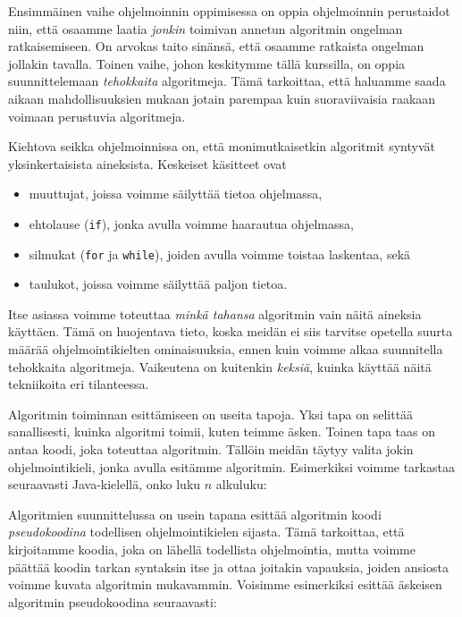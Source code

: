 Ensimmäinen vaihe ohjelmoinnin oppimisessa on oppia
ohjelmoinnin perustaidot niin, että osaamme laatia
\emph{jonkin} toimivan annetun algoritmin ongelman ratkaisemiseen.
On arvokas taito sinänsä, että osaamme ratkaista
ongelman jollakin tavalla.
Toinen vaihe, johon keskitymme tällä kurssilla,
on oppia suunnittelemaan \emph{tehokkaita} algoritmeja.
Tämä tarkoittaa, että haluamme saada aikaan mahdollisuuksien mukaan
jotain parempaa kuin suoraviivaisia
raakaan voimaan perustuvia algoritmeja.

Kiehtova seikka ohjelmoinnissa on, että monimutkaisetkin algoritmit
syntyvät yksinkertaisista aineksista. Keskeiset käsitteet ovat

\begin{itemize}
\item muuttujat, joissa voimme säilyttää tietoa ohjelmassa,
\item ehtolause (\texttt{if}), jonka avulla voimme haarautua ohjelmassa,
\item silmukat (\texttt{for} ja \texttt{while}), joiden avulla voimme
toistaa laskentaa, sekä
\item taulukot, joissa voimme säilyttää paljon tietoa.
\end{itemize}

Itse asiassa voimme toteuttaa \emph{minkä tahansa} algoritmin
vain näitä aineksia käyttäen.
Tämä on huojentava tieto, koska meidän ei siis tarvitse opetella
suurta määrää ohjelmointikielten ominaisuuksia,
ennen kuin voimme alkaa suunnitella tehokkaita algoritmeja.
Vaikeutena on kuitenkin \emph{keksiä}, kuinka käyttää näitä
tekniikoita eri tilanteessa.

Algoritmin toiminnan esittämiseen on useita tapoja.
Yksi tapa on selittää sanallisesti, kuinka algoritmi toimii,
kuten teimme äsken.
Toinen tapa taas on antaa koodi, joka toteuttaa algoritmin.
Tällöin meidän täytyy valita jokin ohjelmointikieli,
jonka avulla esitämme algoritmin.
Esimerkiksi voimme tarkastaa seuraavasti Java-kielellä,
onko luku $n$ alkuluku:


Algoritmien suunnittelussa on usein tapana esittää
algoritmin koodi \emph{pseudokoodina} todellisen ohjelmointikielen sijasta.
Tämä tarkoittaa, että kirjoitamme koodia,
joka on lähellä todellista ohjelmointia, mutta voimme
päättää koodin tarkan syntaksin itse ja ottaa joitakin vapauksia,
joiden ansiosta voimme kuvata algoritmin mukavammin.
Voisimme esimerkiksi esittää äskeisen algoritmin pseudokoodina seuraavasti:

